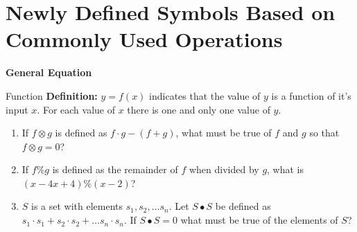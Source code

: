 \section[New Symbols]{Newly Defined Symbols Based on Commonly Used Operations}
\bigskip
\textbf{General Equation} 

\bigskip
\begin{equationbox}{Function}
\textbf{Definition:} $y=f(x)$ indicates that the value of $y$ is a function of it's input $x$. For each value of $x$ there is one and only one value of $y$.
\end{equationbox}

\bigskip
\begin{enumerate}[labelindent=*,style=multiline,leftmargin=*,label=\textbf{Example \arabic*:}]
\item If $f\otimes g$ is defined as $f\cdot g-(f+g)$, what must be true of $f$ and $g$ so that $f\otimes g=0$?

\vfill\item If $f\%g$ is defined as the remainder of $f$ when divided by $g$, what is $(x-4x+4)\%(x-2)$?

\vfill\item $S$ is a set with elements $s_1, s_2,\ldots s_n$. Let $S\bullet S$ be defined as $s_1\cdot s_1+s_2\cdot s_2+\ldots s_n\cdot s_n$. If $S\bullet S=0$ what must be true of the elements of $S$?
\end{enumerate}

